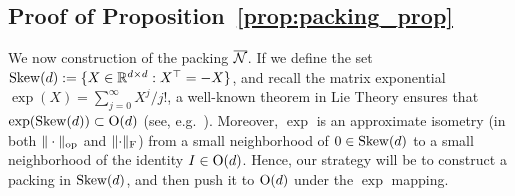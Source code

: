\subsection{Proof of Proposition~\ref{prop:packing_prop}\label{sec:packing_sec}}
We now construction of the packing $\overline{\mathcal{N}}$. If we define the set $\mathrm{Skew}(d) := \{X \in \mathbb{R}^{d\times d}: X^\top = - X\}$, and recall the matrix exponential $\exp(X) = \sum_{j=0}^\infty X^j/j!$, a well-known theorem in Lie Theory ensures that $\exp(\mathrm{Skew}(d)) \subset \mathrm{O}(d)$ (see, e.g.~\cite{knapp2016representation}). Moreover, $\exp$ is an approximate isometry (in both $\|\cdot\|_{\mathrm{op}}$ and $\lVert \cdot \rVert_{\mathrm{F}}$) from a small neighborhood of $0 \in \mathrm{Skew}(d)$ to a small neighborhood of the identity $I \in \mathrm{O}(d)$. Hence, our strategy will be to construct a packing in $\mathrm{Skew}(d)$, and then push it to $\mathrm{O}(d)$ under the $\exp$ mapping.

